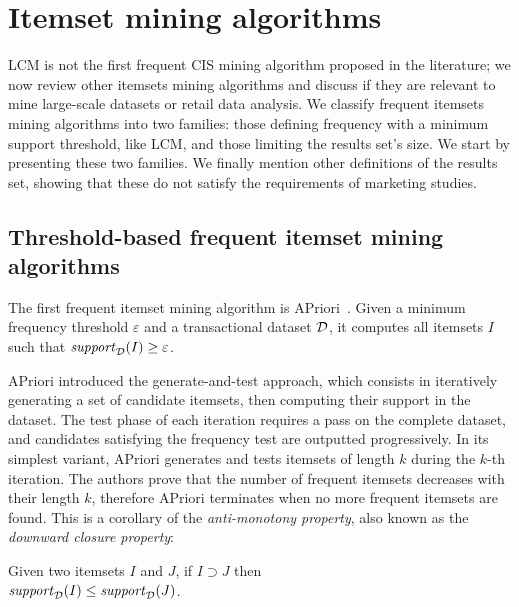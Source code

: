 \section{Itemset mining algorithms}
\label{sec:rel:fim}

LCM is not the first frequent CIS mining algorithm proposed in the literature;
we now review other itemsets mining algorithms
and discuss if they are relevant to mine large-scale datasets or retail data analysis.
We classify frequent itemsets mining algorithms into two families:
those defining frequency with a minimum support threshold, like LCM,
and those limiting the results set's size.
We start by presenting these two families.
We finally mention other definitions of the results set,
showing that these do not satisfy the requirements of marketing studies.



\subsection{Threshold-based frequent itemset mining algorithms}
\label{sec:rel:freq}

The first frequent itemset mining algorithm is APriori~\cite{AgrawalSIGMOD93,AgrawalVLDB94}.
Given a minimum frequency threshold $\varepsilon$ and a transactional dataset $\cal D$,
it computes all itemsets $I$ such that $\mathit{support}_{\cal D}(I) \geq \varepsilon$.

APriori introduced the generate-and-test approach,
which consists in iteratively generating a set of candidate itemsets,
then computing their support in the dataset.
The test phase of each iteration requires a pass on the complete dataset,
and candidates satisfying the frequency test are outputted progressively.
In its simplest variant,
APriori generates and tests itemsets of length $k$ during the $k$-th iteration.
The authors prove that the number of frequent itemsets decreases with their length $k$,
therefore APriori terminates when no more frequent itemsets are found.
This is a corollary of the {\em anti-monotony property},
also known as the {\em downward closure property}:

\begin{property}
	\centering
	Given two itemsets $I$ and $J$,
	if $I \supset J$ then \\$\mathit{support}_{\cal D}(I) \leq  \mathit{support}_{\cal D}(J)$.
	\label{prop:antimonotony}
\end{property}

